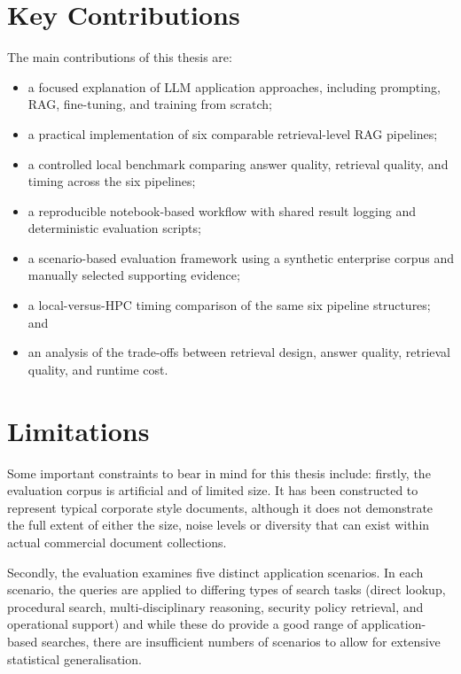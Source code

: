 \section{Key Contributions}

The main contributions of this thesis are:

\begin{itemize}
    \item a focused explanation of \ac{LLM} application approaches, including prompting, \ac{RAG}, fine-tuning, and training from scratch;
    \item a practical implementation of six comparable retrieval-level \ac{RAG} pipelines;
    \item a controlled local benchmark comparing answer quality, retrieval quality, and timing across the six pipelines;
    \item a reproducible notebook-based workflow with shared result logging and deterministic evaluation scripts;
    \item a scenario-based evaluation framework using a synthetic enterprise corpus and manually selected supporting evidence;
    \item a local-versus-\ac{HPC} timing comparison of the same six pipeline structures; and
    \item an analysis of the trade-offs between retrieval design, answer quality, retrieval quality, and runtime cost.
\end{itemize}

\section{Limitations}

Some important constraints to bear in mind for this thesis include: firstly, the evaluation corpus is artificial and of limited size. It has been constructed to represent typical corporate style documents, although it does not demonstrate the full extent of either the size, noise levels or diversity that can exist within actual commercial document collections.

Secondly, the evaluation examines five distinct application scenarios. In each scenario, the queries are applied to differing types of search tasks (direct lookup, procedural search, multi-disciplinary reasoning, security policy retrieval, and operational support) and while these do provide a good range of application-based searches, there are insufficient numbers of scenarios to allow for extensive statistical generalisation.

